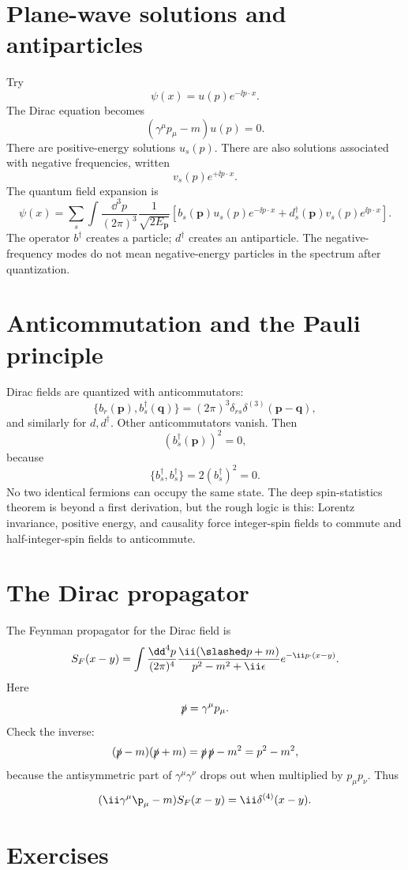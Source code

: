 \section{Plane-wave solutions and antiparticles}

Try
\[
  \psi(x)=u(p)e^{-\ii p\cdot x}.
\]
The Dirac equation becomes
\[
  (\gamma^\mu p_\mu-m)u(p)=0.
\]
There are positive-energy solutions \(u_s(p)\).  There are also solutions associated with negative frequencies, written
\[
  v_s(p)e^{+\ii p\cdot x}.
\]
The quantum field expansion is
\[
  \psi(x)=
  \sum_s\int\frac{\dd^3p}{(2\pi)^3}
  \frac1{\sqrt{2E_{\bm p}}}
  \left[
  b_s(\bm p)u_s(p)e^{-\ii p\cdot x}
  +
  d_s^\dagger(\bm p)v_s(p)e^{\ii p\cdot x}
  \right].
\]
The operator \(b^\dagger\) creates a particle; \(d^\dagger\) creates an antiparticle.  The negative-frequency modes do not mean negative-energy particles in the spectrum after quantization.

\section{Anticommutation and the Pauli principle}

Dirac fields are quantized with anticommutators:
\[
  \{b_r(\bm p),b_s^\dagger(\bm q)\}
  =
  (2\pi)^3\delta_{rs}\delta^{(3)}(\bm p-\bm q),
\]
and similarly for \(d,d^\dagger\).  Other anticommutators vanish.  Then
\[
  (b_s^\dagger(\bm p))^2=0,
\]
because
\[
  \{b_s^\dagger,b_s^\dagger\}=2(b_s^\dagger)^2=0.
\]
No two identical fermions can occupy the same state.  The deep spin-statistics theorem is beyond a first derivation, but the rough logic is this: Lorentz invariance, positive energy, and causality force integer-spin fields to commute and half-integer-spin fields to anticommute.

\section{The Dirac propagator}

The Feynman propagator for the Dirac field is
\[
  S_F(x-y)=\int\frac{\dd^4p}{(2\pi)^4}
  \frac{\ii(\slashed p+m)}{p^2-m^2+\ii\epsilon}
  e^{-\ii p\cdot(x-y)}.
\]
Here
\[
  \slashed p=\gamma^\mu p_\mu.
\]
Check the inverse:
\[
  (\slashed p-m)(\slashed p+m)
  =
  \slashed p\,\slashed p-m^2
  =
  p^2-m^2,
\]
because the antisymmetric part of \(\gamma^\mu\gamma^\nu\) drops out when multiplied by \(p_\mu p_\nu\).  Thus
\[
  (\ii\gamma^\mu\p_\mu-m)S_F(x-y)=\ii\delta^{(4)}(x-y).
\]

\section*{Exercises}

